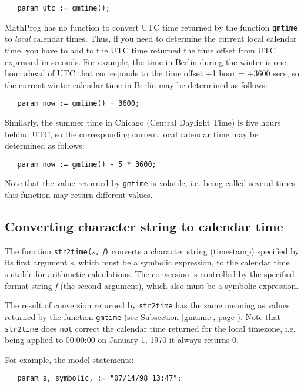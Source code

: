 \documentclass[10pt]{article}
\begin{document}
\verb|   param utc := gmtime();|

\medskip

MathProg has no function to convert UTC time returned by the function
{\tt gmtime} to {\it local} calendar times. Thus, if you need to
determine the current local calendar time, you have to add to the UTC
time returned the time offset from UTC expressed in seconds. For
example, the time in Berlin during the winter is one hour ahead of UTC
that corresponds to the time offset +1 hour = +3600 secs, so the
current winter calendar time in Berlin may be determined as follows:

\medskip

\verb|   param now := gmtime() + 3600;|

\medskip

\noindent Similarly, the summer time in Chicago (Central Daylight Time)
is five hours behind UTC, so the corresponding current local calendar
time may be determined as follows:

\medskip

\verb|   param now := gmtime() - 5 * 3600;|

\medskip

Note that the value returned by {\tt gmtime} is volatile, i.e. being
called several times this function may return different values.

\subsection{Converting character string to calendar time}
\label{str2time}

The function {\tt str2time(}{\it s}{\tt,} {\it f}{\tt)} converts a
character string (timestamp) specified by its first argument {\it s},
which must be a symbolic expression, to the calendar time suitable for
arithmetic calculations. The conversion is controlled by the specified
format string {\it f} (the second argument), which also must be a
symbolic expression.

The result of conversion returned by {\tt str2time} has the same
meaning as values returned by the function {\tt gmtime} (see Subsection
\ref{gmtime}, page \pageref{gmtime}). Note that {\tt str2time} does
{\tt not} correct the calendar time returned for the local timezone,
i.e. being applied to 00:00:00 on January 1, 1970 it always returns 0.

For example, the model statements:

\medskip

\verb|   param s, symbolic, := "07/14/98 13:47";|
\end{document}
